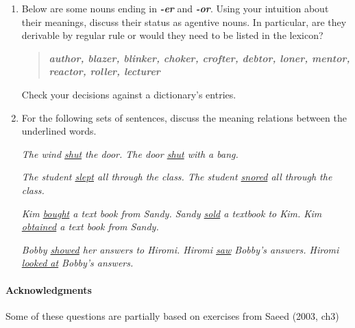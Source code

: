 \documentclass[a4paper]{article}
\newcommand{\lex}[1]{\textbf{\textit{#1}}}
\newcommand{\ix}{\ex\it}
\newcommand{\ul}[1]{\uline{#1}}
\begin{document}
\begin{enumerate}
\item  Below are some nouns ending in \lex{-er} and \lex{-or}. Using your intuition
about their meanings, discuss their status as agentive nouns. In
particular, are they derivable by regular rule or would they need to
be listed in the lexicon?
\begin{quote}
\lex{author, blazer, blinker, choker, crofter, debtor, loner, mentor,
reactor, roller, lecturer}
\end{quote}
Check your decisions against a dictionary's entries.
\item For the following sets of sentences, discuss the meaning relations
  between the underlined words.
  \begin{exe}
    \ex 
    \begin{xlist}
      \ix The wind \ul{shut} the door.
      \ix The door \ul{shut} with a bang.
    \end{xlist}
    \ex 
    \begin{xlist}
      \ix The student \ul{slept} all through the class.
      \ix The student \ul{snored} all through the class.
    \end{xlist}
   \ex 
    \begin{xlist}
      \ix Kim \ul{bought} a text book from Sandy.
      \ix Sandy \ul{sold} a textbook to Kim.
      \ix Kim \ul{obtained} a text book from Sandy.
    \end{xlist}
   \ex 
    \begin{xlist}
      \ix Bobby \ul{showed} her answers to  Hiromi.
      \ix Hiromi \ul{saw} Bobby's answers.
      \ix Hiromi \ul{looked at} Bobby's answers.
    \end{xlist}
  \end{exe}

\end{enumerate}


\vfill
\paragraph{Acknowledgments} Some of these questions are partially
based on exercises from Saeed (2003, ch3)
\end{document}
